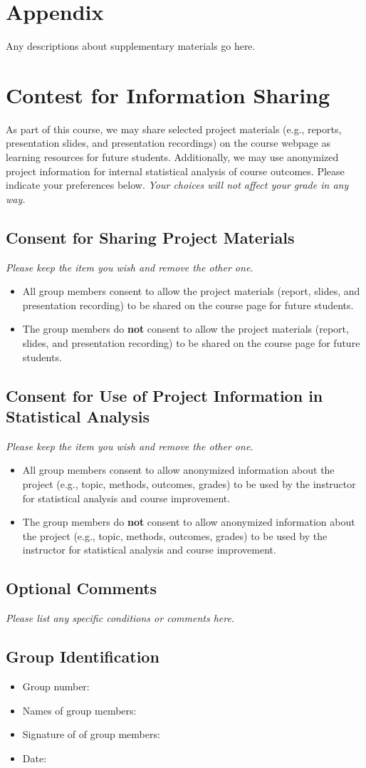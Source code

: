 \documentclass{article}
\begin{document}
\section*{Appendix}
Any descriptions about supplementary materials go here.


\newpage
\section*{Contest for Information Sharing}
As part of this course, we may share selected project materials (e.g., reports, presentation slides, and presentation recordings) on the course webpage as learning resources for future students. Additionally, we may use anonymized project information for internal statistical analysis of course outcomes. Please indicate your preferences below. \textit{Your choices will not affect your grade in any way.}

\subsection*{Consent for Sharing Project Materials}
\textit{Please keep the item you wish and remove the other one.}

\begin{itemize}
	\item All group members consent to allow the project materials (report, slides, and presentation recording) to be shared on the course page for future students.
	\item The group members do \textbf{not} consent to allow the project materials (report, slides, and presentation recording) to be shared on the course page for future students.
\end{itemize}

\subsection*{Consent for Use of Project Information in Statistical Analysis}
\textit{Please keep the item you wish and remove the other one.}
\begin{itemize}
	\item All group members consent to allow anonymized information about the project (e.g., topic, methods, outcomes, grades) to be used by the instructor for statistical analysis and course improvement.
	\item The group members do \textbf{not} consent to allow anonymized information about the project (e.g., topic, methods, outcomes, grades) to be used by the instructor for statistical analysis and course improvement.
\end{itemize}

\subsection*{Optional Comments}
\textit{Please list any specific conditions or comments here.}

\subsection*{Group Identification}

\begin{itemize}
	\item Group number:
	\item Names of group members: 
	\item Signature of of group members: 
	\item Date: 
\end{itemize}
\end{document}
